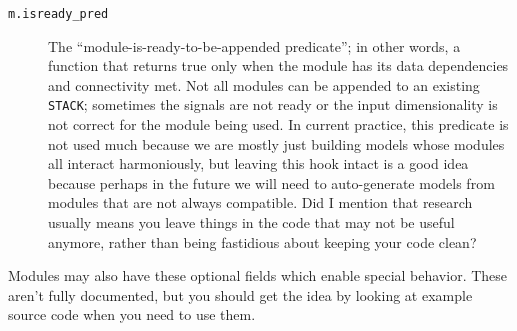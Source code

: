 \documentclass[letterpaper]{report}
\newcommand{\matlab}[1]{\texttt{#1}}
\begin{document}
\begin{description}
\item [\matlab{m.isready\_pred}] The ``module-is-ready-to-be-appended predicate''; in other words, a function that returns true only when the module has its data dependencies and connectivity met. Not all modules can be appended to an existing \matlab{STACK}; sometimes the signals are not ready or the input dimensionality is not correct for the module being used. In current practice, this predicate is not used much because we are mostly just building models whose modules all interact harmoniously, but leaving this hook intact is a good idea because perhaps in the future we will need to auto-generate models from modules that are not always compatible. Did I mention that research usually means you leave things in the code that may not be useful anymore, rather than being fastidious about keeping your code clean?

\end{description}

Modules may also have these optional fields which enable special behavior. These aren't fully documented, but you should get the idea by looking at example source code when you need to use them.
\end{document}

